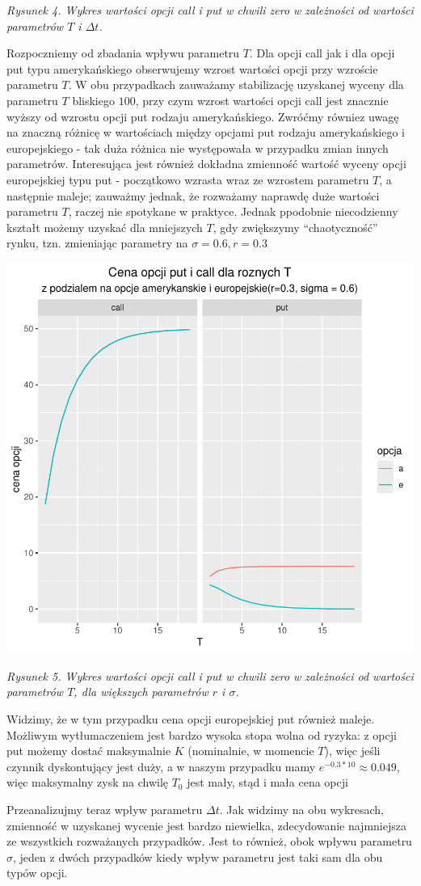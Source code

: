 \documentclass[
]{article}
\begin{document}
\emph{Rysunek 4. Wykres wartości opcji call i put w chwili zero w
zależności od wartości parametrów \(T\) i \(\Delta t\).}

Rozpoczniemy od zbadania wpływu parametru \(T\). Dla opcji call jak i
dla opcji put typu amerykańskiego obserwujemy wzrost wartości opcji przy
wzroście parametru \(T\). W obu przypadkach zauważamy stabilizację
uzyskanej wyceny dla parametru \(T\) bliskiego \(100\), przy czym wzrost
wartości opcji call jest znacznie wyższy od wzrostu opcji put rodzaju
amerykańskiego. Zwróćmy równiez uwagę na znaczną różnicę w wartościach
między opcjami put rodzaju amerykańskiego i europejskiego - tak duża
różnica nie występowała w przypadku zmian innych parametrów.
Interesująca jest również dokładna zmienność wartość wyceny opcji
europejskiej typu put - początkowo wzrasta wraz ze wzrostem parametru
\(T\), a następnie maleje; zauważmy jednak, że rozważamy naprawdę duże
wartości parametru \(T\), raczej nie spotykane w praktyce. Jednak
ppodobnie niecodzienny kształt możemy uzyskać dla mniejszych \(T\), gdy
zwiększymy ``chaotyczność'' rynku, tzn. zmieniając parametry na
\(\sigma = 0.6,r = 0.3\)

\begin{center}\includegraphics[width=0.4\linewidth]{wykresy/d_r_T_dzikie} \end{center}

\emph{Rysunek 5. Wykres wartości opcji call i put w chwili zero w
zależności od wartości parametrów \(T\), dla większych parametrów \(r\)
i \(\sigma\).}

Widzimy, że w tym przypadku cena opcji europejskiej put również maleje.
Możliwym wytłumaczeniem jest bardzo wysoka stopa wolna od ryzyka: z
opcji put możemy dostać maksymalnie \(K\) (nominalnie, w momencie
\(T\)), więc jeśli czynnik dyskontujący jest duży, a w naszym przypadku
mamy \(e^{-0.3*10}\approx 0.049\), więc maksymalny zysk na chwilę
\(T_0\) jest mały, stąd i mała cena opcji

Przeanalizujmy teraz wpływ parametru \(\Delta t\). Jak widzimy na obu
wykresach, zmienność w uzyskanej wycenie jest bardzo niewielka,
zdecydowanie najmniejsza ze wszystkich rozważanych przypadków. Jest to
również, obok wpływu parametru \(\sigma\), jeden z dwóch przypadków
kiedy wpływ parametru jest taki sam dla obu typów opcji.
\end{document}
